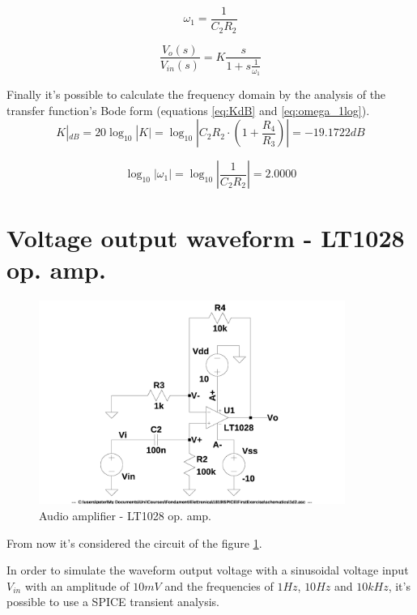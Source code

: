 \documentclass[10pt,a4paper]{book}
\begin{document}
\begin{equation} \label{eq:omega_1}
  \omega_1 = \frac{1}{C_2R_2}
\end{equation}

\begin{equation} \label{eq:TFBode}
  \frac{V_o(s)}{V_{in}(s)} = K \frac{s}{1+s\frac{1}{\omega_1}}
\end{equation}

Finally it's possible to calculate the frequency domain by the analysis of the transfer function's Bode form (equations \ref{eq:KdB} and \ref{eq:omega_1log}).\\
\begin{equation} \label{eq:KdB}
  K|_{dB} = 20\log_{10}|K| = \log_{10}\left|C_2R_2 \cdot \left(1+\frac{R_4}{R_3}\right)\right| = -19.1722 dB
\end{equation}

\begin{equation} \label{eq:omega_1log}
  \log_{10} |\omega_1| =
  \log_{10} \left| \frac{1}{C_2R_2} \right|= 2.0000
\end{equation}

\section{Voltage output waveform - LT1028 op. amp.}
\begin{figure}[H]
  \centering
  \includegraphics[width=10cm]{schematics/1d2.jpg}
  \caption{Audio amplifier - LT1028 op. amp.}
  \label{1d2schematics}
\end{figure}

From now it's considered the circuit of the figure \ref{1d2schematics}.\par
\medskip
In order to simulate the waveform output voltage with a sinusoidal voltage input $V_{in}$ with an amplitude of $10mV$ and the frequencies of $1Hz$, $10Hz$ and $10kHz$, it's possible to use a SPICE transient analysis.\\
\end{document}
